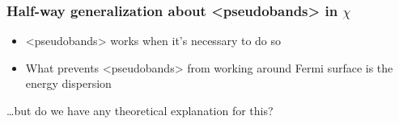 \documentclass[t,aspectratio=169]{beamer}
\newcommand{\shortcode}[1]{\texttt{#1}}
\def\texttt#1{<#1>}%
\begin{document}
\begin{frame}
\frametitle{Half-way generalization about \shortcode{pseudobands} in $\chi$}

\begin{itemize}
    \item[\faHandPointRight] \shortcode{pseudobands} works  
    when it's necessary to do so 
    \item[\faHandPointRight] What prevents \shortcode{pseudobands} from working 
    around Fermi surface is the energy dispersion
\end{itemize}

\vspace{0.5cm}

\dots but do we have any theoretical explanation for this?

\end{frame}
\end{document}
